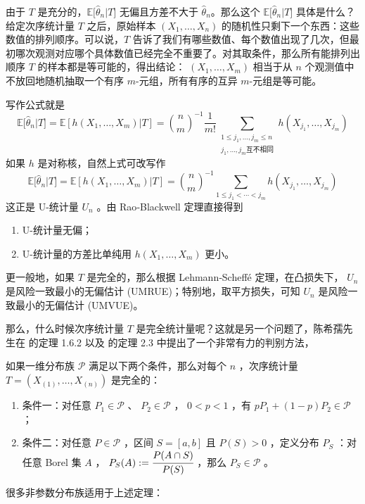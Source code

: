 由于 $T$ 是充分的，$\mathbb E\big[\widehat\theta_n|T\big]$ 无偏且方差不大于 $\widehat\theta_n$。那么这个 $\mathbb E\big[\widehat\theta_n|T\big]$ 具体是什么？给定次序统计量 $T$ 之后，原始样本 $(X_1,\ldots,X_n)$ 的随机性只剩下一个东西：这些数值的排列顺序。可以说，$T$ 告诉了我们有哪些数值、每个数值出现了几次，但最初哪次观测对应哪个具体数值已经完全不重要了。对其取条件，那么所有能排列出顺序 $T$ 的样本都是等可能的，得出结论： $(X_1,\ldots,X_m)$ 相当于从 $n$ 个观测值中不放回地随机抽取一个有序 $m$-元组，所有有序的互异 $m$-元组是等可能。

写作公式就是\[ \mathbb E\big[\widehat\theta_n|T\big] = \mathbb{E}[h(X_1,\ldots,X_m)| T] = {\binom nm}^{-1}\frac1{m!} \sum_{\substack{1\le j_1,\dots,j_m\le n\\ j_1,\dots,j_m \text{互不相同}}}h(X_{j_1},\ldots,X_{j_m}) \]
如果 $h$ 是对称核，自然上式可改写作
\[\mathbb E\big[\widehat\theta_n|T\big] = \mathbb{E}[h(X_1,\ldots,X_m)| T] = {\binom nm}^{-1}  \sum_{1\le j_1<\cdots<j_m}h(X_{j_1},\ldots,X_{j_m})\]
这正是 U-统计量 $U_n$ 。由 Rao‑Blackwell 定理直接得到

\begin{enumerate}
\def\labelenumi{\arabic{enumi}.}
\tightlist
\item
  U-统计量无偏；
\item
  U-统计量的方差比单纯用 $h(X_1,\dots,X_m)$ 更小。
\end{enumerate}

更一般地，如果 $T$ 是完全的，那么根据 Lehmann‑Scheffé 定理，在凸损失下， $U_n$ 是风险一致最小的无偏估计 (UMRUE)；特别地，取平方损失，可知 $U_n$ 是风险一致最小的无偏估计 (UMVUE)。

那么，什么时候次序统计量 $T$ 是完全统计量呢？这就是另一个问题了，陈希孺先生在 \cite{chenxiru1981} 的定理 1.6.2 以及 \cite{chenxiru2009} 的定理 2.3 中提出了一个非常有力的判别方法，


\begin{theorem}[充分统计量完全性判别]\label{thm:ch10:chen-completeness}
如果一维分布族 $\mathscr{P}$ 满足以下两个条件，那么对每个 $n$ ，次序统计量 $T=(X_{(1)},\dots,X_{(n)})$ 是完全的：

\begin{enumerate}
\def\labelenumi{\arabic{enumi}.}
\tightlist
\item
  条件一：对任意 $P_1\in\mathscr{P}$ 、 $P_2\in\mathscr{P}$ ， $0<p<1$ ，有 $pP_1+(1-p)P_2\in\mathscr{P}$ ；
\item
  条件二：对任意 $P\in\mathscr{P}$ ，区间 $S=[a,b]$ 且 $P(S)>0$ ，定义分布 $P_S$ ：对任意 Borel 集 $A$ ， $P_S(A):=\cfrac{P(A\cap S)}{P(S)}$ ，那么 $P_S\in \mathscr{P}$ 。
\end{enumerate}

\end{theorem}
很多非参数分布族适用于上述定理：

